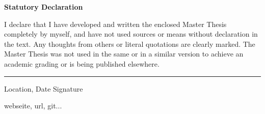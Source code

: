 \documentclass[12pt, twoside]{report}
\begin{document}
{\huge \textbf{Statutory Declaration}} \bigskip

I declare that I have developed and written the enclosed Master Thesis completely by myself, and have not used sources or means without declaration in the text. Any thoughts from others or literal quotations are clearly marked. The Master Thesis was not used in the same or in a similar version to achieve an academic grading or is being published elsewhere.
\newline
\newline
\newline
\rule{\textwidth}{1pt}
Location, Date \hfill Signature 


\newpage
webseite, url, git...











\end{document}

